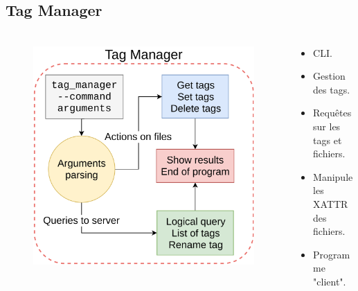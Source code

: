 \documentclass[10pt]{beamer}
\begin{document}
\subsection{Tag Manager}
\begin{frame}
    \frametitle{\subsecname}
    \begin{columns}[T]
        \begin{column}{.5\textwidth}
            \begin{figure}
                \begin{center}
                    \includegraphics[width=1\textwidth]{images/tag_manager2.png}
                \end{center}
            \end{figure}
        \end{column}
        \pause
        \begin{column}{.5\textwidth}
            \begin{itemize}
                \item CLI.
                \item Gestion des tags.
                \item Requêtes sur les tags et fichiers.
                \item Manipule les XATTR des fichiers.
                \item Programme "client".
            \end{itemize}
        \end{column}
    \end{columns}
\end{frame}
\end{document}
